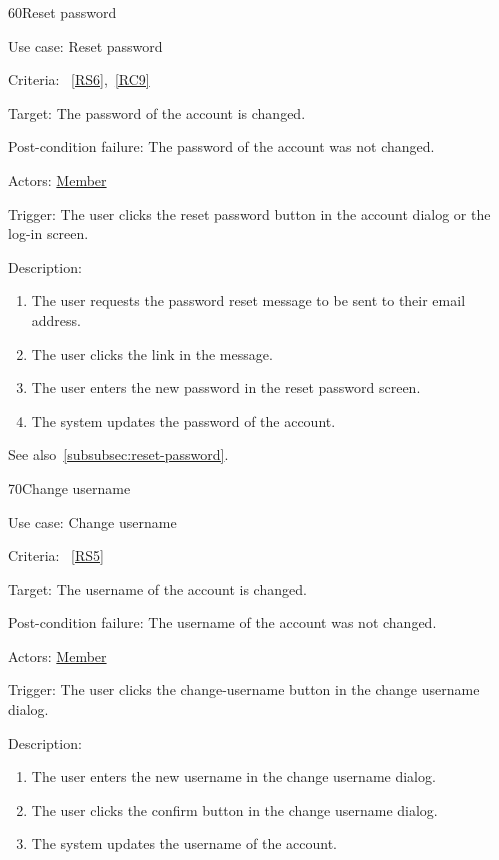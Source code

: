 \vspace{2.0em}


\begin{function}{60}{Reset password}
	\item[Use case:] Reset password
	\item[Criteria:]~\ref{RS6},~\ref{RC9}
	\item[Target:] The password of the account is changed.
	\item[Post-condition failure:] The password of the account was not changed.
	\item[Actors:] \hyperref[def:member]{Member}
	\item[Trigger:] The user clicks the reset password button in the account dialog or the log-in screen.
	\item[Description:] ~
	\begin{enumerate}
		\item The user requests the password reset message to be sent to their email address.
		\item The user clicks the link in the message.
		\item The user enters the new password in the reset password screen.
		\item The system updates the password of the account.
	\end{enumerate}
	See also~\ref{subsubsec:reset-password}.
\end{function}
\vspace{2.0em}

\begin{function}{70}{Change username}
	\item[Use case:] Change username
	\item[Criteria:]~\ref{RS5}
	\item[Target:] The username of the account is changed.
	\item[Post-condition failure:] The username of the account was not changed.
	\item[Actors:] \hyperref[def:member]{Member}
	\item[Trigger:] The user clicks the change-username button in the change username dialog.
	\item[Description:] ~
	\begin{enumerate}
		\item The user enters the new username in the change username dialog.
		\item The user clicks the confirm button in the change username dialog.
		\item The system updates the username of the account.
	\end{enumerate}
\end{function}

